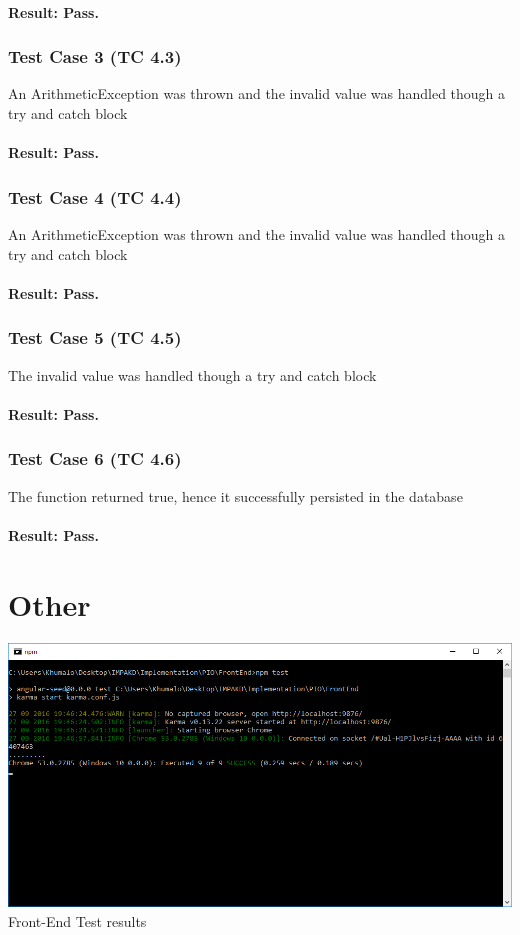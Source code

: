 \documentclass[a4paper,12pt]{article}
\begin{document}
\paragraph{Result: Pass.}

\subsubsection{Test Case 3 (TC 4.3)}
An ArithmeticException was thrown and the invalid value was handled though a try and catch block 

\paragraph{Result: Pass.}
\subsubsection{Test Case 4 (TC 4.4)}
An ArithmeticException was thrown and the invalid value was handled though a try and catch block 

\paragraph{Result: Pass.}

\subsubsection{Test Case 5 (TC 4.5)}
The invalid value was handled though a try and catch block 
\paragraph{Result: Pass.}

\subsubsection{Test Case 6 (TC 4.6)}
The function returned true, hence it successfully persisted in the database
\paragraph{Result: Pass.}
\section{Other}
\includegraphics[width=1\textwidth]{./Images/AddPropertyKarmaTest.png}\\
Front-End Test results \\
\end{document}
